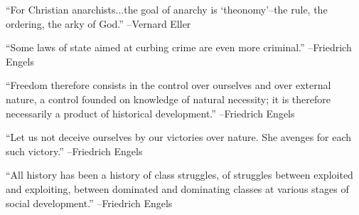 \documentclass{article}%
\begin{document}
\linebreak%
\vspace{1mm}%
\begin{minipage}{\textwidth}%
\flushleft%
“For Christian anarchists...the goal of anarchy is ‘theonomy’–the rule, the ordering, the arky of God.”%
\linebreak%
\vspace{1mm}%
–Vernard Eller%
\linebreak%
\vspace{1mm}%
\end{minipage}%
\linebreak%
\vspace{1mm}%
\begin{minipage}{\textwidth}%
\flushleft%
“Some laws of state aimed at curbing crime are even more criminal.”%
\linebreak%
\vspace{1mm}%
–Friedrich Engels%
\linebreak%
\vspace{1mm}%
\end{minipage}%
\linebreak%
\vspace{1mm}%
\begin{minipage}{\textwidth}%
\flushleft%
“Freedom therefore consists in the control over ourselves and over external nature, a control founded on knowledge of natural necessity; it is therefore necessarily a product of historical development.”%
\linebreak%
\vspace{1mm}%
–Friedrich Engels%
\linebreak%
\vspace{1mm}%
\end{minipage}%
\linebreak%
\vspace{1mm}%
\begin{minipage}{\textwidth}%
\flushleft%
“Let us not deceive ourselves by our victories over nature. She avenges for each such victory.”%
\linebreak%
\vspace{1mm}%
–Friedrich Engels%
\linebreak%
\vspace{1mm}%
\end{minipage}%
\linebreak%
\vspace{1mm}%
\begin{minipage}{\textwidth}%
\flushleft%
“All history has been a history of class struggles, of struggles between exploited and exploiting, between dominated and dominating classes at various stages of social development.”%
\linebreak%
\vspace{1mm}%
–Friedrich Engels%
\linebreak%
\vspace{1mm}%
\end{minipage}%
\end{document}
